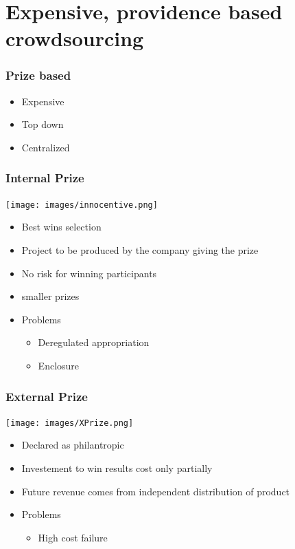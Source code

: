 \documentclass{beamer}
\begin{document}
\section{Expensive, providence based crowdsourcing}
\label{sec-6}
\begin{frame}
\frametitle{Prize based}
\label{sec-6_1}


\begin{itemize}
\item Expensive
\item Top down
\item Centralized
\end{itemize}
\end{frame}
\begin{frame}
\frametitle{Internal Prize}
\label{sec-6_2}


  \texttt{[image: images/innocentive.png]}

\begin{itemize}
\item Best wins selection
\item Project to be produced by the company giving the prize
\item No risk for winning participants
\item smaller prizes
\end{itemize}
\begin{itemize}

\item Problems
\label{sec-6_2_1}%
\begin{itemize}
\item Deregulated appropriation
\item Enclosure
\end{itemize}



\end{itemize} %
\end{frame}
\begin{frame}
\frametitle{External Prize}
\label{sec-6_3}


  \texttt{[image: images/XPrize.png]}

\begin{itemize}
\item Declared as philantropic
\item Investement to win results cost only  partially
\item Future revenue comes from independent distribution of product
\end{itemize}
\begin{itemize}

\item Problems
\label{sec-6_3_1}%
\begin{itemize}
\item High cost failure
\end{itemize}



\end{itemize} %
\end{frame}
\end{document}
